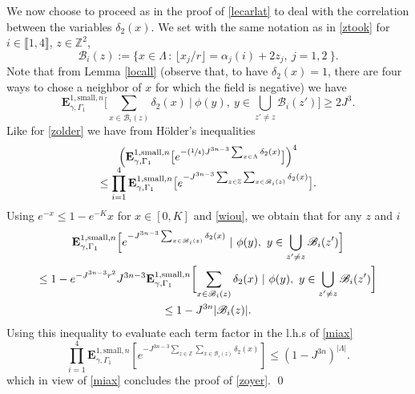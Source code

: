 \documentclass[10pt]{amsart}
\let\mathcal\mathscr
\newcommand{\sep}{\,:\,}
\newcommand{\Psfrac}[2]{(\sfrac{#1}{#2})}
\numberwithin{equation}{section}
\theoremstyle{plain}
\theoremstyle{definition}
\newcommand{\sm}{\mathrm{small}}
\newcommand{\lint}{\llbracket}
\newcommand{\rint}{\rrbracket}
\newcommand{\cB}{{\ensuremath{\mathcal B}} }
\newcommand{\bE}{{\ensuremath{\mathbf E}} }
\newcommand{\bbZ}{{\ensuremath{\mathbb Z}} }
\newcommand{\gG}{\Gamma}
\newcommand{\gL}{\Lambda}
\begin{document}
We now choose to proceed as in the proof of \eqref{lecarlat} to deal with the correlation
between the variables $\delta_2(x)$.
We set with the same notation as in \eqref{ztook} for $i\in \lint 1, 4 \rint$, $z\in \bbZ^2$,
\begin{equation*}%
\cB_i(z):=\{ x\in \gL \sep \lfloor x_j/r \rfloor=\alpha_j(i)+2z_j,\ j=1,2\ \}.
\end{equation*}
Note that from Lemma \ref{locall} (observe that, to have $\delta_2(x)=1$, there are four ways to chose a neighbor of $x$ for which the field is negative) we have
\begin{equation}\label{wiou}
\bE^{1,\sm,n}_{\gamma,\gG_1}\biggl[ \sum_{x\in \cB_i(z)} \delta_2(x) \ | \ \phi(y), \ y \in \bigcup_{z'\ne z}\cB_i(z') \biggr]\ge 2 J^3.
\end{equation}
Like for \eqref{zolder} we have from Hölder's inequalities\vspace*{-3pt}
\begin{multline}\label{miax}
\Bigl(\bE^{1,\sm,n}_{\gamma,\gG_1}\bigl[ e^{ -\Psfrac{1}{4}J^{3n-3} \sum_{x\in \gL}\delta_2(x)} \bigr]\Bigr)^4\\[-5pt]
\le \prod_{i=1}^4 \bE^{1,\sm,n}_{\gamma,\gG_1}\bigl[ e^{-J^{3n-3} \sum_{z\in \bbZ}\sum_{x\in \cB_i(z)} \delta_2(x)} \bigr].
\end{multline}
Using $e^{-x}\le 1-e^{-K}x$ for $x\in[0,K]$ and \eqref{wiou}, we obtain that for any $z$ and $i$\vspace*{-3pt}
\begin{multline*}
\bE^{1,\sm,n}_{\gamma,\gG_1}\Bigl[ e^{-J^{3n-3} \sum_{x\in \cB_i(z)} \delta_2(x)} \ | \ \phi(y), \ y \in \bigcup_{z'\ne z}\cB_i(z') \Bigr]\\
\le 1-e^{-J^{3n-3}r^2}J^{3n-3}\bE^{1,\sm,n}_{\gamma,\gG_1}\biggl[ \sum_{x\in \cB_i(z)} \delta_2(x) \ | \ \phi(y), \ y \in \bigcup_{z'\ne z}\cB_i(z') \biggr]
\\ \le 1- J^{3n}|\cB_i(z)|.
\end{multline*}
Using this inequality to evaluate each term factor in the l.h.s of \eqref{miax}\vspace*{-3pt}
\begin{equation*}
\prod_{i=1}^4 \bE^{1,\sm,n}_{\gamma,\gG_1}\left[ e^{-J^{3n-3} \sum_{z\in \bbZ}\sum_{x\in \cB_i(z)} \delta_2(x)} \right]\le
\left(1-J^{3n}\right)^{|\gL|}.
\end{equation*}
which in view of \eqref{miax} concludes the proof of \eqref{zoyer}. \qed
\end{document}
